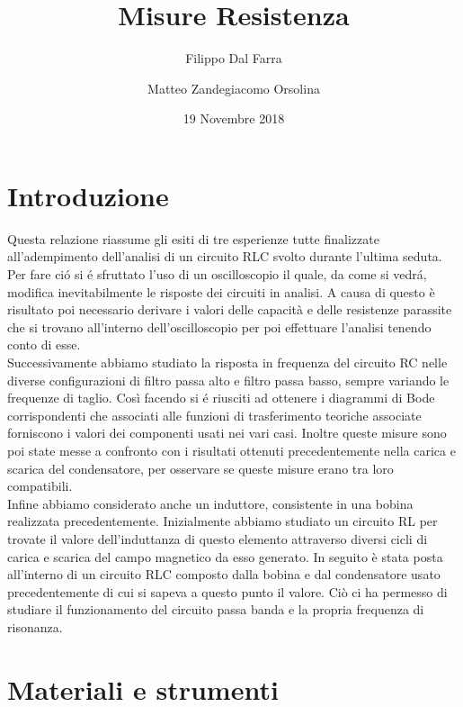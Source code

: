 \documentclass{article}
\title{Misure Resistenza}
\author{Filippo Dal Farra \and Matteo Zandegiacomo Orsolina}
\date{19 Novembre 2018}
\begin{document}
\maketitle

\newpage

\section{Introduzione}

Questa relazione riassume gli esiti di tre esperienze tutte finalizzate all'adempimento dell'analisi di un circuito RLC svolto durante l'ultima seduta. Per fare ci\'o si \'e sfruttato l'uso di un oscilloscopio il quale, da come si vedr\'a, modifica inevitabilmente le risposte dei circuiti in analisi. A causa di questo è risultato poi necessario derivare i valori delle capacità e delle resistenze parassite che si trovano all'interno dell'oscilloscopio per poi effettuare l'analisi tenendo conto di esse. \\

Successivamente abbiamo studiato la risposta in frequenza del circuito RC nelle diverse configurazioni di filtro passa alto e filtro passa basso, sempre variando le frequenze di taglio. Così facendo si \'e riusciti ad ottenere i diagrammi di Bode corrispondenti che associati alle funzioni di trasferimento teoriche associate forniscono i valori dei componenti usati nei vari casi. Inoltre queste misure sono poi state messe a confronto con i risultati ottenuti precedentemente nella carica e scarica del condensatore, per osservare se queste misure erano tra loro compatibili. \\

Infine abbiamo considerato anche un induttore, consistente in una bobina realizzata precedentemente. Inizialmente abbiamo studiato un circuito RL per trovate il valore dell'induttanza di questo elemento attraverso diversi cicli di carica e scarica del campo magnetico da esso generato. In seguito è stata posta all'interno di un circuito RLC composto dalla bobina e dal condensatore usato precedentemente di cui si sapeva a questo punto il valore. Ciò ci ha permesso di studiare il funzionamento del circuito passa banda e la propria frequenza di risonanza.

\newpage

\section{Materiali e strumenti}
\end{document}
